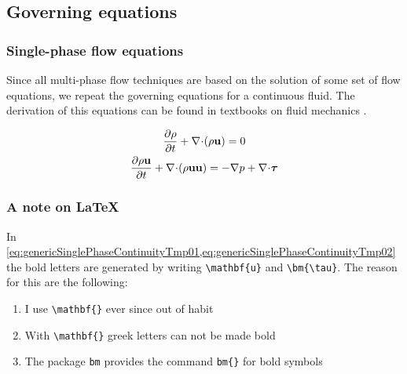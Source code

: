 \subsection{Governing equations}


\subsubsection{Single-phase flow equations}
\label{sec:singlePhaseFlowEquations}

Since all multi-phase flow techniques are based on the solution of some set of flow equations, 
we repeat the governing equations for a continuous fluid. The derivation of this equations can 
be found in textbooks on fluid mechanics \cite{versteegMalalasekera1995,Anderson1995}.

\begin{gather}
	\frac{\partial \rho}{\partial t} + \nabla\kern-.2em\cdot\kern-.2em\left( \rho \mathbf{u} \right) = 0 
		\label{eq:genericSinglePhaseContinuityTmp01} \\
	\frac{\partial \rho  \mathbf{u}}{\partial t}
		+ \nabla\kern-.2em\cdot\kern-.2em\left( \rho \mathbf{u} \mathbf{u} \right)
		= -\nabla p + \nabla\kern-.2em\cdot\kern-.2em\bm{\tau} \label{eq:genericSinglePhaseContinuityTmp02}
\end{gather}


%
%
%
%
%



\subsubsection*{A note on \LaTeX{}}

In \cref{eq:genericSinglePhaseContinuityTmp01,eq:genericSinglePhaseContinuityTmp02} the bold letters 
are generated by writing \verb+\mathbf{u}+ and \verb+\bm{\tau}+. The reason for this are the 
following:

\begin{enumerate}
	\item I use \verb+\mathbf{}+ ever since out of habit
	\item With \verb+\mathbf{}+ greek letters can not be made bold
	\item The package \verb+bm+ provides the command \verb+bm{}+ for bold symbols
\end{enumerate}


